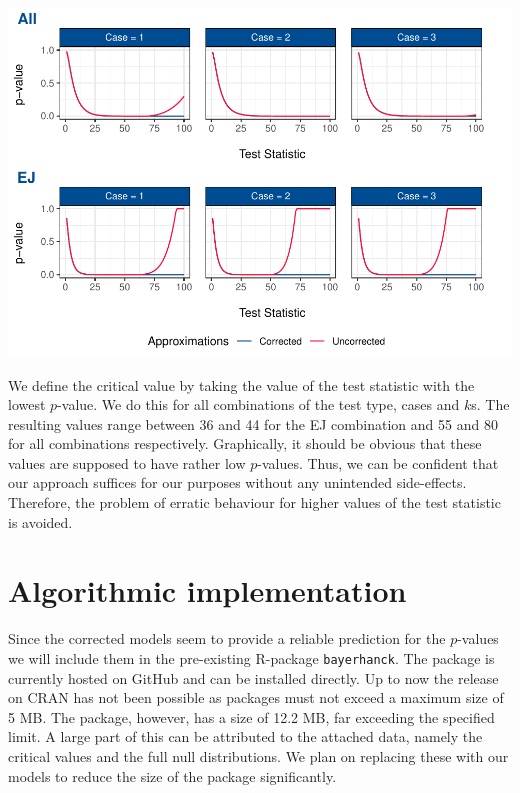 \documentclass[12pt,a4paper]{article}
\let\origfigure\figure
\let\endorigfigure\endfigure
\renewenvironment{figure}[1][2] {
    \expandafter\origfigure\expandafter[H]
} {
    \endorigfigure
}
\begin{document}
\begin{figure}
\centering
\includegraphics{p_approx_paper_files/figure-latex/p_stat__k.2-1.pdf}
\caption{\label{fig:e_j_k.1} Simulated \(p\)-values plotted against
\(p\)-values approximated by final corrected models, exemplary for
\(k = 1\). Corrected (blue) and uncorrected (red) \(p\)-value
predictions for all cases and \(k = 2\), using EJ and all as underlying
tests.}
\end{figure}

We define the critical value by taking the value of the test statistic
with the lowest \(p\)-value. We do this for all combinations of the test
type, cases and \(k\)s. The resulting values range between 36 and 44 for
the EJ combination and 55 and 80 for all combinations respectively.
Graphically, it should be obvious that these values are supposed to have
rather low \(p\)-values. Thus, we can be confident that our approach
suffices for our purposes without any unintended side-effects.
Therefore, the problem of erratic behaviour for higher values of the
test statistic is avoided.

\hypertarget{algorithmic-implementation}{%
\section{Algorithmic implementation}\label{algorithmic-implementation}}

Since the corrected models seem to provide a reliable prediction for the
\(p\)-values we will include them in the pre-existing R-package
\texttt{bayerhanck}. The package is currently hosted on GitHub and can
be installed directly. Up to now the release on \ac{CRAN} has not been
possible as packages must not exceed a maximum size of 5 MB. The
package, however, has a size of 12.2 MB, far exceeding the specified
limit. A large part of this can be attributed to the attached data,
namely the critical values and the full null distributions. We plan on
replacing these with our models to reduce the size of the package
significantly.
\end{document}
